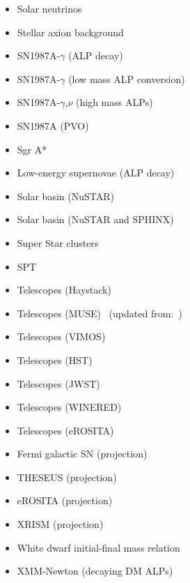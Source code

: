 \documentclass[8pt,twocolumn]{extarticle}
\begin{document}
\begin{mdframed}[everyline=true]
\begin{itemize}
    \item Solar neutrinos~\cite{Vinyoles2015}
    \item Stellar axion background~\cite{Nguyen:2023czp}
    \item SN1987A-$\gamma$ (ALP decay)~\cite{Jaeckel:2017tud,Hoof:2022xbe,Muller:2023vjm}
    \item SN1987A-$\gamma$ (low mass ALP conversion)~\cite{Payez:2014xsa,Hoof:2022xbe,Manzari:2024jns}
    \item SN1987A-$\gamma$,$\nu$ (high mass ALPs)~\cite{Lucente:2020whw,Caputo:2021rux,Caputo:2022mah}
    \item SN1987A (PVO)~\cite{Diamond:2023scc}
    \item Sgr A*~\cite{Yuan:2020xui}
    \item Low-energy supernovae (ALP decay)~\cite{Caputo:2022mah}
    \item Solar basin (NuSTAR)~\cite{DeRocco:2022jyq}
    \item Solar basin (NuSTAR and SPHINX)~\cite{Beaufort:2023zuj}
    \item Super Star clusters~\cite{Dessert:2020lil}
    \item SPT~\cite{SPT-3G:2022ods}
    \item Telescopes (Haystack)~\cite{Blout:2000uc}
    \item Telescopes (MUSE)~\cite{Todarello:2023hdk} (updated from:~\cite{Regis:2020fhw})
    \item Telescopes (VIMOS)~\cite{Grin:2006aw}
    \item Telescopes (HST)~\cite{Nakayama:2022jza,Carenza:2023qxh}
    \item Telescopes (JWST)~\cite{Janish:2023kvi}
    \item Telescopes (WINERED)~\cite{Bessho:2022yyu,Yin:2024lla}
    \item Telescopes (eROSITA)~\cite{Fong:2024qeq}
    \item Fermi galactic SN (projection)~\cite{Meyer:2016wrm}
     \item THESEUS (projection)~\cite{Thorpe-Morgan:2020rwc}
    \item eROSITA (projection)~\cite{Dekker:2021bos}
    \item XRISM (projection)~\cite{Dessert:2023vyl}
   \item White dwarf initial-final mass relation~\cite{Dolan:2021rya}
   \item XMM-Newton (decaying DM ALPs)~\cite{Foster:2021ngm}
\end{itemize}
\vspace{-2.5em}

\end{mdframed}
\end{document}
